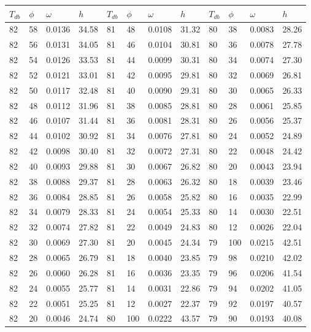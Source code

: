 \begin{tabular}{llll|llll|llll}
 \toprule 
\(T_{db}\) & \(\phi\) & \(\omega\) & \(h\) & \(T_{db}\) & \(\phi\) & \(\omega\) & \(h\) & \(T_{db}\) & \(\phi\) & \(\omega\) & \(h\)  \\ \midrule 
82 & 58 & 0.0136 & 34.58 & 81 & 48 & 0.0108 & 31.32 & 80 & 38 & 0.0083 & 28.26\\
82 & 56 & 0.0131 & 34.05 & 81 & 46 & 0.0104 & 30.81 & 80 & 36 & 0.0078 & 27.78\\
82 & 54 & 0.0126 & 33.53 & 81 & 44 & 0.0099 & 30.31 & 80 & 34 & 0.0074 & 27.30\\
82 & 52 & 0.0121 & 33.01 & 81 & 42 & 0.0095 & 29.81 & 80 & 32 & 0.0069 & 26.81\\
82 & 50 & 0.0117 & 32.48 & 81 & 40 & 0.0090 & 29.31 & 80 & 30 & 0.0065 & 26.33\\
82 & 48 & 0.0112 & 31.96 & 81 & 38 & 0.0085 & 28.81 & 80 & 28 & 0.0061 & 25.85\\
82 & 46 & 0.0107 & 31.44 & 81 & 36 & 0.0081 & 28.31 & 80 & 26 & 0.0056 & 25.37\\
82 & 44 & 0.0102 & 30.92 & 81 & 34 & 0.0076 & 27.81 & 80 & 24 & 0.0052 & 24.89\\
82 & 42 & 0.0098 & 30.40 & 81 & 32 & 0.0072 & 27.31 & 80 & 22 & 0.0048 & 24.42\\
82 & 40 & 0.0093 & 29.88 & 81 & 30 & 0.0067 & 26.82 & 80 & 20 & 0.0043 & 23.94\\
82 & 38 & 0.0088 & 29.37 & 81 & 28 & 0.0063 & 26.32 & 80 & 18 & 0.0039 & 23.46\\
82 & 36 & 0.0084 & 28.85 & 81 & 26 & 0.0058 & 25.82 & 80 & 16 & 0.0035 & 22.99\\
82 & 34 & 0.0079 & 28.33 & 81 & 24 & 0.0054 & 25.33 & 80 & 14 & 0.0030 & 22.51\\
82 & 32 & 0.0074 & 27.82 & 81 & 22 & 0.0049 & 24.83 & 80 & 12 & 0.0026 & 22.04\\
82 & 30 & 0.0069 & 27.30 & 81 & 20 & 0.0045 & 24.34 & 79 & 100 & 0.0215 & 42.51\\
82 & 28 & 0.0065 & 26.79 & 81 & 18 & 0.0040 & 23.85 & 79 & 98 & 0.0210 & 42.02\\
82 & 26 & 0.0060 & 26.28 & 81 & 16 & 0.0036 & 23.35 & 79 & 96 & 0.0206 & 41.54\\
82 & 24 & 0.0055 & 25.77 & 81 & 14 & 0.0031 & 22.86 & 79 & 94 & 0.0202 & 41.05\\
82 & 22 & 0.0051 & 25.25 & 81 & 12 & 0.0027 & 22.37 & 79 & 92 & 0.0197 & 40.57\\
82 & 20 & 0.0046 & 24.74 & 80 & 100 & 0.0222 & 43.57 & 79 & 90 & 0.0193 & 40.08\\

\end{tabular}
